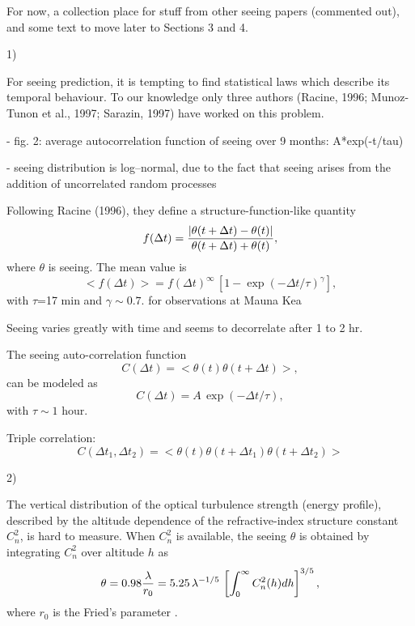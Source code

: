 
 
For now, a collection place for stuff from other seeing papers (commented out),
and some text to move later to Sections 3 and 4. 


1) \cite{VMT1998} 

For seeing prediction, it is tempting to find statistical laws which describe its temporal behaviour.
To our knowledge only three authors (Racine, 1996; Munoz-Tunon et al., 1997; Sarazin, 1997) 
have worked on this problem. 

- fig. 2: average autocorrelation function of seeing over 9 months:  A*exp(-t/tau) 

- seeing distribution is  log–normal, due to the fact that seeing arises from the addition of uncorrelated random processes

Following Racine (1996), they define a structure-function-like quantity
\begin{equation}
       f(\Delta t) = {| \theta(t+\Delta t) - \theta(t)| \over  \theta(t+\Delta t) + \theta(t) },
\end{equation} 
where $\theta$ is seeing. The mean value is
\begin{equation}
    < f(\Delta t) > =  f(\Delta t) ^\infty \, \left[ 1 - \exp(-\Delta t/\tau)^\gamma \right],
\end{equation} 
with $\tau$=17 min and $\gamma \sim 0.7$. for observations at Mauna Kea \cite{Racine1996}

Seeing varies greatly with time and seems to decorrelate after 1 to 2 hr. 

The seeing auto-correlation function
\begin{equation}
      C(\Delta t) = < \theta(t) \theta(t+\Delta t)>,
\end{equation} 
can be modeled as
\begin{equation}
      C(\Delta t) = A \, \exp(-\Delta t/\tau),
\end{equation} 
with $\tau \sim 1$ hour. 
 
Triple correlation:
\begin{equation}
      C(\Delta t_1, \Delta t_2) = < \theta(t) \theta(t+\Delta t_1)\theta(t+\Delta t_2) >
\end{equation} 

2) 

The vertical distribution of the optical turbulence strength (energy profile), described by the altitude 
dependence of the refractive-index structure constant $C^2_n$, is hard to measure. When $C^2_n$ 
is available, the seeing $\theta$ is obtained by integrating $C^2_n$ over altitude $h$ as 
\begin{equation}
   \theta =  0.98 {\lambda \over r_0} = 5.25 \, \lambda^{-1/5} \, \left[ \int_0^\infty C_n^2(h) dh \right]^{3/5},
\end{equation}
where $r_0$ is the Fried's parameter \cite{Roddier1981}. 






